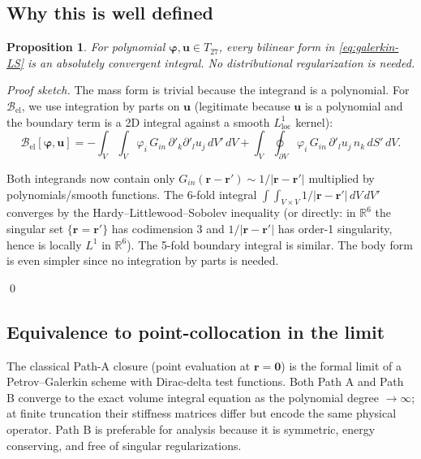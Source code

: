 \documentclass[11pt,a4paper]{article}
\newcommand{\br}{\bm{r}}
\newcommand{\bu}{\bm{u}}
\newcommand{\bphi}{\bm{\varphi}}
\newcommand{\R}{\mathbb{R}}
\theoremstyle{plain}
\newtheorem{proposition}[theorem]{Proposition}
\theoremstyle{definition}
\theoremstyle{remark}
\begin{document}
\subsection{Why this is well defined}

\begin{proposition}\label{prop:wellposed}
For polynomial $\bphi,\bu \in T_{27}$, every bilinear form in
\eqref{eq:galerkin-LS} is an absolutely convergent integral.  No
distributional regularization is needed.
\end{proposition}
\begin{proof}[Proof sketch]
The mass form is trivial because the integrand is a polynomial.
For $\mathcal{B}_{\text{el}}$, we use integration by parts on $\bu$
(legitimate because $\bu$ is a polynomial and the boundary term is a
2D integral against a smooth $L^1_{\text{loc}}$ kernel):
\begin{equation}
\mathcal{B}_{\text{el}}[\bphi,\bu]
=
-\int_{V}\!\!\int_V\!\varphi_i\,G_{in}\,\partial'_k\partial'_l u_j\,dV'\,dV
+ \int_{V}\!\!\oint_{\partial V}\!\varphi_i\,G_{in}\,\partial'_l u_j\,n_k\,dS'\,dV.
\end{equation}
{\sloppy
Both integrands now contain only $G_{in}(\br-\br') \sim 1/|\br-\br'|$ multiplied
by polynomials/smooth functions.  The 6-fold integral
$\int\!\!\int_{V\times V}1/|\br-\br'|\,dV\,dV'$ converges by the
Hardy--Littlewood--Sobolev inequality (or directly: in
$\R^{6}$ the singular set $\{\br = \br'\}$ has codimension $3$ and
$1/|\br-\br'|$ has order-1 singularity, hence is locally
$L^{1}$ in $\R^{6}$).  The 5-fold boundary integral is similar.
The body form is even simpler since no integration by parts is needed.\par}
\qed
\end{proof}

\subsection{Equivalence to point-collocation in the limit}

The classical Path-A closure (point evaluation at $\br = \mathbf{0}$) is
the formal limit of a Petrov--Galerkin scheme with Dirac-delta test
functions.  Both Path A and Path B converge to the exact volume integral
equation as the polynomial degree $\to \infty$; at finite truncation
their stiffness matrices differ but encode the same physical operator.
Path B is preferable for analysis because it is symmetric, energy
conserving, and free of singular regularizations.
\end{document}
